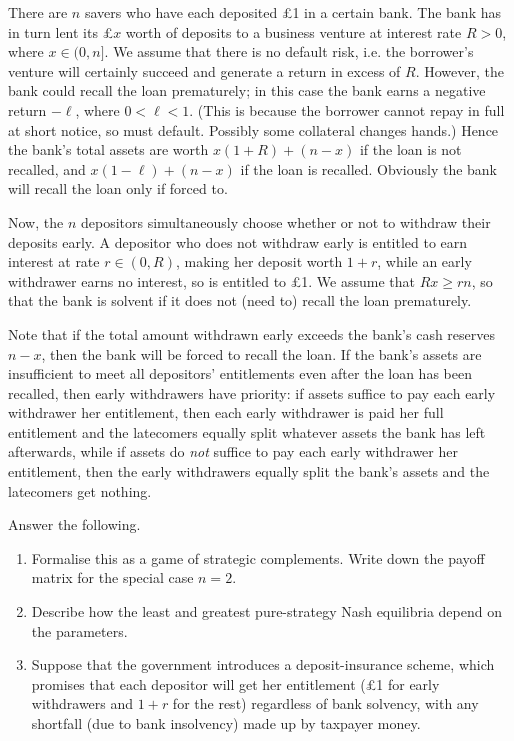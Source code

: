 \begin{exercise}
	\label{exercise:bank_run}
	There are $n$ savers who have each deposited £1 in a certain bank. The bank has in turn lent its £$x$ worth of deposits to a business venture at interest rate $R>0$, where $x \in (0,n]$. We assume that there is no default risk, i.e. the borrower's venture will certainly succeed and generate a return in excess of $R$. However, the bank could recall the loan prematurely; in this case the bank earns a negative return $-\ell$, where $0<\ell<1$. (This is because the borrower cannot repay in full at short notice, so must default. Possibly some collateral changes hands.) Hence the bank's total assets are worth $x(1+R)+(n-x)$ if the loan is not recalled, and $x(1-\ell)+(n-x)$ if the loan is recalled. Obviously the bank will recall the loan only if forced to.

	Now, the $n$ depositors simultaneously choose whether or not to withdraw their deposits early. A depositor who does not withdraw early is entitled to earn interest at rate $r \in (0,R)$, making her deposit worth $1+r$, while an early withdrawer earns no interest, so is entitled to £1. We assume that $Rx \geq rn$, so that the bank is solvent if it does not (need to) recall the loan prematurely.

	Note that if the total amount withdrawn early exceeds the bank's cash reserves $n-x$, then the bank will be forced to recall the loan. If the bank's assets are insufficient to meet all depositors' entitlements even after the loan has been recalled, then early withdrawers have priority: if assets suffice to pay each early withdrawer her entitlement, then each early withdrawer is paid her full entitlement and the latecomers equally split whatever assets the bank has left afterwards, while if assets do \emph{not} suffice to pay each early withdrawer her entitlement, then the early withdrawers equally split the bank's assets and the latecomers get nothing.

	Answer the following.

	\begin{enumerate}[label=(\arabic*)]

		\item Formalise this as a game of strategic complements. Write down the payoff matrix for the special case $n=2$.

		\item Describe how the least and greatest pure-strategy Nash equilibria depend on the parameters.

		\item Suppose that the government introduces a deposit-insurance scheme, which promises that each depositor will get her entitlement (£1 for early withdrawers and $1+r$ for the rest) regardless of bank solvency, with any shortfall (due to bank insolvency) made up by taxpayer money.


\end{enumerate}
\end{exercise}
